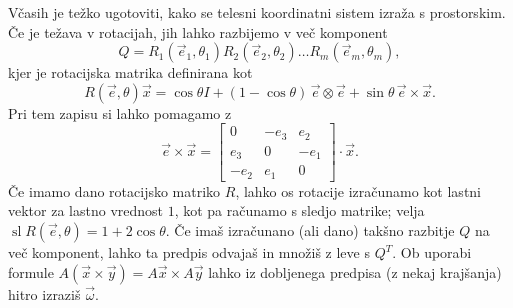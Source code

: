 Včasih je težko ugotoviti, kako se telesni koordinatni sistem izraža s
prostorskim.
Če je težava v rotacijah, jih lahko razbijemo v več komponent
\[
  Q = R_1(\vec{e}_1, \theta_1) R_2(\vec{e}_2, \theta_2) \ldots R_m(\vec{e}_m,
  \theta_m),
\]
kjer je rotacijska matrika definirana kot
\[
  R(\vec{e}, \theta) \vec{x}
  = \cos \theta I + (1 - \cos \theta)\,\vec{e} \otimes \vec{e} + \sin \theta\,
  \vec{e} \times \vec{x}.
\]
Pri tem zapisu si lahko pomagamo z
\[
  \vec{e} \times \vec{x} =
  \begin{bmatrix}
	0 & -e_3 & e_2 \\
	e_3 & 0 & -e_1 \\
	-e_2 & e_1 & 0
  \end{bmatrix}
  \cdot \vec{x}.
\]
Če imamo dano rotacijsko matriko $R$, lahko os rotacije izračunamo kot lastni
vektor za lastno vrednost $1$, kot pa računamo s sledjo matrike; velja
$\operatorname{sl} R(\vec{e}, \theta) = 1 + 2 \cos \theta$.
Če imaš izračunano (ali dano) takšno razbitje $Q$ na več komponent, lahko ta
predpis odvajaš in množiš z leve s $Q^T$.
Ob uporabi formule $A(\vec{x} \times \vec{y}) = A \vec{x} \times A \vec{y}$
lahko iz dobljenega predpisa (z nekaj krajšanja) hitro izraziš $\vec{\omega}$.
